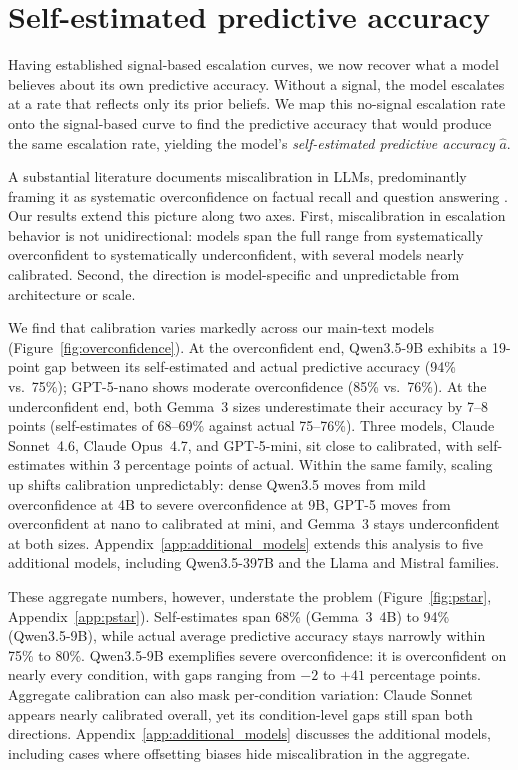 \documentclass{article}
\begin{document}
\section{Self-estimated predictive accuracy}
\label{sec:results2}

Having established signal-based escalation curves, we now recover what a model believes about its own predictive accuracy. Without a signal, the model escalates at a rate that reflects only its prior beliefs. We map this no-signal escalation rate onto the signal-based curve to find the predictive accuracy that would produce the same escalation rate, yielding the model's \emph{self-estimated predictive accuracy} $\hat{a}$.

A substantial literature documents miscalibration in LLMs, predominantly framing it as systematic overconfidence on factual recall and question answering \citep{kadavath2022language, xiong2024can, tian2023just, lin2022teaching, mielke2022reducing, guo2017calibration}. Our results extend this picture along two axes. First, miscalibration in escalation behavior is not unidirectional: models span the full range from systematically overconfident to systematically underconfident, with several models nearly calibrated. Second, the direction is model-specific and unpredictable from architecture or scale.

We find that calibration varies markedly across our main-text models (Figure~\ref{fig:overconfidence}). At the overconfident end, Qwen3.5-9B exhibits a 19-point gap between its self-estimated and actual predictive accuracy (94\% vs.\ 75\%); GPT-5-nano shows moderate overconfidence (85\% vs.\ 76\%). At the underconfident end, both Gemma~3 sizes underestimate their accuracy by 7--8 points (self-estimates of 68--69\% against actual 75--76\%). Three models, Claude Sonnet~4.6, Claude Opus~4.7, and GPT-5-mini, sit close to calibrated, with self-estimates within 3 percentage points of actual. Within the same family, scaling up shifts calibration unpredictably: dense Qwen3.5 moves from mild overconfidence at 4B to severe overconfidence at 9B, GPT-5 moves from overconfident at nano to calibrated at mini, and Gemma~3 stays underconfident at both sizes. Appendix~\ref{app:additional_models} extends this analysis to five additional models, including Qwen3.5-397B and the Llama and Mistral families.

These aggregate numbers, however, understate the problem (Figure~\ref{fig:pstar}, Appendix~\ref{app:pstar}). Self-estimates span 68\% (Gemma~3~4B) to 94\% (Qwen3.5-9B), while actual average predictive accuracy stays narrowly within 75\% to 80\%. Qwen3.5-9B exemplifies severe overconfidence: it is overconfident on nearly every condition, with gaps ranging from $-2$ to $+41$ percentage points. Aggregate calibration can also mask per-condition variation: Claude Sonnet appears nearly calibrated overall, yet its condition-level gaps still span both directions. Appendix~\ref{app:additional_models} discusses the additional models, including cases where offsetting biases hide miscalibration in the aggregate.
\end{document}
